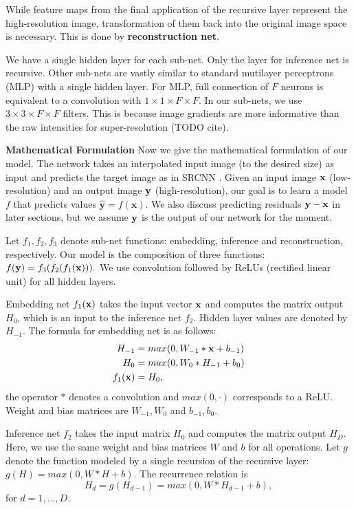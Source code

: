 \documentclass[10pt,twocolumn,letterpaper]{article}
\begin{document}
While feature maps from the final application of the recursive layer represent the high-resolution image, transformation of them back into the original image space is necessary. This is done by \textbf{reconstruction net}.  

We have a single hidden layer for each sub-net. Only the layer for inference net is recursive. Other sub-nets are vastly similar to standard mutilayer perceptrons (MLP) with a single hidden layer. For MLP, full connection of $F$ neurons is equivalent to a convolution with $1\times 1\times F \times F$. In our sub-nets, we use $3\times 3\times F \times F$ filters. This is because image gradients are more informative than the raw intensities for super-resolution  (TODO cite).

\textbf{Mathematical Formulation} Now we give the mathematical formulation of our model. The network takes an interpolated input image (to the desired size) as input and predicts the target image as in SRCNN \cite{Dong2014}. Given an input image ${\bf x}$ (low-resolution) and an output image ${\bf y}$ (high-resolution), our goal is to learn a model $f$ that predicts values $\mathbf{\hat{y}}=f(\mathbf{x})$.  We also discuss predicting residuals ${\bf y - x} $ in later sections, but we assume ${\bf y}$ is the output of our network for the moment.

 Let $f_1, f_2, f_3$ denote sub-net functions: embedding, inference and reconstruction, respectively. Our model is the composition of three functions: $f({\bf y}) = f_3(f_2 (f_1({\bf x}))).$ We use convolution followed by ReLUs (rectified linear unit) for all hidden layers. 
 
 Embedding net $f_1({\bf x})$ takes the input vector ${\bf x}$ and computes the matrix output $H_0$, which is an input to the inference net $f_2$. Hidden layer values are denoted by $H_{-1}$. The formula for embedding net is as follows:
  \begin{align}
        H_{-1} &= max(0, W_{-1}*{\bf x} + b_{-1})\\
        H_0 &= max(0, W_{0}*H_{-1} + b_0)\\
        f_1({\bf x}) &= H_0,
    \end{align}
the operator $*$ denotes a convolution and $max(0,\cdot)$ corresponds to a ReLU. Weight and bias matrices are $W_{-1},W_0$ and $b_{-1},b_0$.

Inference net $f_2$ takes the input matrix $H_0$ and computes the matrix output $H_{D}$. Here, we use the same weight and bias matrices $W$ and $b$ for all operations.  Let $g$ denote the function modeled by a single recursion of the recursive layer: $g(H)=max(0,W*H+b)$. The recurrence relation is  
\begin{equation}
 H_d = g(H_{d-1}) = max(0,W*H_{d-1}+b),
\end{equation}
for $d = 1, ..., D$. 
\end{document}
